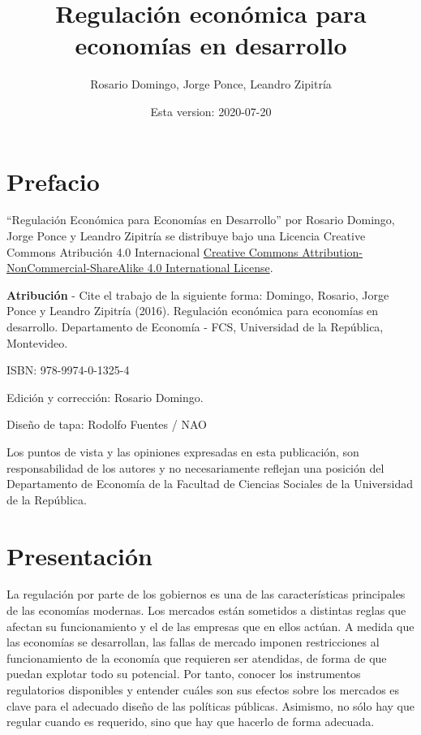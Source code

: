 \documentclass[
  12pt,
  spanish,
]{book}
\title{Regulación económica para economías en desarrollo}
\author{Rosario Domingo, Jorge Ponce, Leandro Zipitría}
\date{Esta version: 2020-07-20}
\begin{document}
\maketitle

{
\setcounter{tocdepth}{1}
\tableofcontents
}
\newpage

\hypertarget{prefacio}{%
\chapter*{Prefacio}\label{prefacio}}

``Regulación Económica para Economías en Desarrollo'' por Rosario Domingo, Jorge Ponce y Leandro Zipitría se distribuye bajo una Licencia Creative Commons Atribución 4.0 Internacional \href{http://creativecommons.org/licenses/by-nc-sa/4.0/}{Creative Commons Attribution-NonCommercial-ShareAlike 4.0 International License}.

\textbf{Atribución} - Cite el trabajo de la siguiente forma: Domingo, Rosario, Jorge Ponce y Leandro Zipitría (2016). Regulación económica para economías en desarrollo. Departamento de Economía - FCS, Universidad de la República, Montevideo.

ISBN: 978-9974-0-1325-4

Edición y corrección: Rosario Domingo.

Diseño de tapa: Rodolfo Fuentes / NAO

Los puntos de vista y las opiniones expresadas en esta publicación, son responsabilidad de los autores y no necesariamente reflejan una posición del Departamento de Economía de la Facultad de Ciencias Sociales de la Universidad de la República.

\newpage

\hypertarget{intro}{%
\chapter*{Presentación}\label{intro}}

La regulación por parte de los gobiernos es una de las características principales de las economías modernas. Los mercados están sometidos a distintas reglas que afectan su funcionamiento y el de las empresas que en ellos actúan. A medida que las economías se desarrollan, las fallas de mercado imponen restricciones al funcionamiento de la economía que requieren ser atendidas, de forma de que puedan explotar todo su potencial. Por tanto, conocer los instrumentos regulatorios disponibles y entender cuáles son sus efectos sobre los mercados es clave para el adecuado diseño de las políticas públicas. Asimismo, no sólo hay que regular cuando es requerido, sino que hay que hacerlo de forma adecuada.
\end{document}
